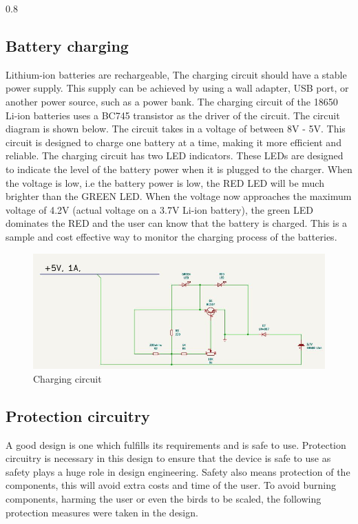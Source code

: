 \documentclass[class=report,11pt,crop=false]{standalone}
\begin{document}
\begin{table}[h!]
\begin{tabularx}{0.8\textwidth}
{{	\subsection{Battery charging}
	Lithium-ion batteries are rechargeable,  The charging circuit should have a stable power supply. This supply can be achieved  by using a wall adapter, USB port, or another power source, such as a power bank. The charging circuit of the 18650 Li-ion batteries uses a BC745 transistor as the driver of the circuit. The circuit diagram is shown below. The circuit takes in a voltage of between 8V - 5V. This circuit is designed to charge one battery at a time, making it more efficient and reliable. The charging circuit has two LED indicators. These LEDs are designed to indicate the level of the battery power when it is plugged to the charger. When the voltage is low, i.e the battery power is low, the RED LED will be much brighter than the GREEN LED. When the voltage now approaches the maximum voltage of 4.2V (actual voltage on a 3.7V Li-ion battery), the green LED dominates the RED and the user can know that the battery is charged. This is a sample and cost effective way to monitor the charging process of the batteries.
	\begin{figure}[h!]
		\centering
		\includegraphics[width=0.8\linewidth]{Figures/Charging.jpg}
		\caption{Charging circuit}
		\label{fig:P2}
	\end{figure}
	\vspace{0.5cm}
	
	
	\subsection{Protection circuitry}
	
	A good design is one which fulfills its requirements and is safe to use. Protection circuitry is necessary in this design to ensure that the device is safe to use as safety plays a huge role in design engineering. Safety also means protection of the components, this will avoid extra costs and time of the user. To avoid burning components, harming the user or even the birds to be scaled, the following protection measures were taken in the design.
	\vspace{0.5cm}
	
}}
\end{tabularx}
\end{table}
\end{document}
